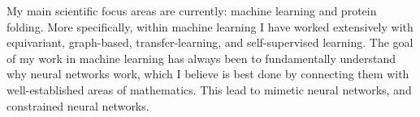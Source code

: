 


My main scientific focus areas are currently: machine learning and protein folding. More specifically, within machine learning I have worked extensively with equivariant, graph-based, transfer-learning, and self-supervised learning. The goal of my work in machine learning has always been to fundamentally understand why neural networks work, which I believe is best done by connecting them with well-established areas of mathematics. This lead to mimetic neural networks, and constrained neural networks.


